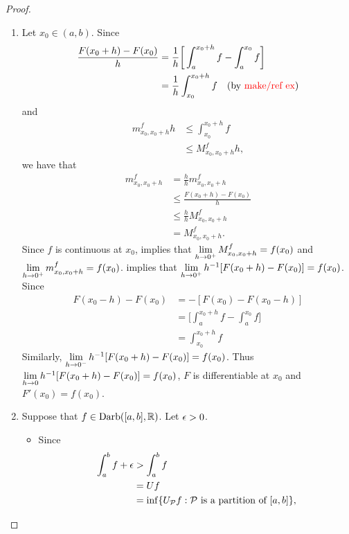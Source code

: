 \documentclass{book}
\begin{document}
	\begin{proof}\
		\begin{enumerate}
			\item Let $x_0 \in (a,b)$. Since
			\begin{align*}
				\frac{F(x_0 + h) - F(x_0)}{h} 
				& = \frac{1}{h} \bigg[ \int_a^{x_0 + h} f  - \int_a^{x_0} f \bigg] \\
				& = \frac{1}{h} \int_{x_0}^{x_0 + h} f \quad \text{(by \textcolor{red}{make/ref ex})}
			\end{align*}
			and 
			\begin{align*}
				m^f_{x_0, x_0 + h} h
				& \leq  \int_{x_0}^{x_0 + h} f \\
				& \leq M^f_{x_0, x_0 + h} h,
			\end{align*}
			we have that 
			\begin{align*}
				m^f_{x_0, x_0 + h} 
				& = \frac{h}{h} m^f_{x_0, x_0 + h}  \\ 
				& \leq  \frac{F(x_0 + h) - F(x_0)}{h}  \\
				& \leq \frac{h}{h} M^f_{x_0, x_0 + h}  \\ 
				& = M^f_{x_0, x_0 + h}.
			\end{align*}
			Since $f$ is continuous at $x_0$,  implies that $\lim \limits_{h \rightarrow 0^+} M^f_{x_0, x_0 + h} = f(x_0)$ and $\lim \limits_{h \rightarrow 0^+} m^f_{x_0, x_0 + h} = f(x_0)$. \rex{}  implies that $\lim \limits_{h \rightarrow 0^+} h^{-1}[F(x_0 + h) - F(x_0)] = f(x_0)$. Since
			\begin{align*}
				F(x_0 - h) - F(x_0)
				& = - [F(x_0) - F(x_0 - h)] \\
				& = \bigg[ \int_a^{x_0 + h} f  - \int_a^{x_0} f \bigg] \\
				& = \int_{x_0}^{x_0 + h} f
			\end{align*}
			Similarly,  $\lim \limits_{h \rightarrow 0^-} h^{-1}[F(x_0 + h) - F(x_0)] = f(x_0)$. Thus $\lim \limits_{h \rightarrow 0} h^{-1}[F(x_0 + h) - F(x_0)] = f(x_0)$, $F$ is differentiable at $x_0$ and $F'(x_0) = f(x_0)$.
			\item Suppose that $f \in \text{Darb}([a,b], \mathbb{R})$. Let $\epsilon > 0$. 
			\begin{itemize}
				\item Since  
				\begin{align*}
					\int_a^b f + \epsilon 
					& > \int_a^b f \\
					& = U f \\
					& = \inf \{U_{\mathcal{P}} f: \text{$\mathcal{P}$ is a partition of $[a,b]$}\},
				\end{align*}

\end{itemize}
\end{enumerate}
\end{proof}
\end{document}
